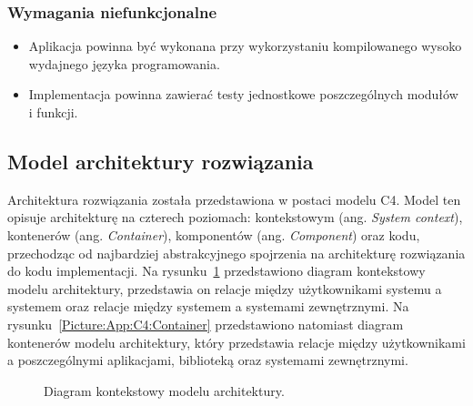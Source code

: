         \subsubsection{Wymagania niefunkcjonalne}

            \begin{itemize}
            \item Aplikacja powinna być wykonana przy wykorzystaniu kompilowanego wysoko wydajnego języka programowania.
                \item Implementacja powinna zawierać testy jednostkowe poszczególnych modułów i funkcji.
            \end{itemize}

    \subsection{Model architektury rozwiązania}

        Architektura rozwiązania została przedstawiona w postaci modelu C4\cite{C4}. Model ten opisuje architekturę na czterech poziomach: kontekstowym (ang. \textit{System context}), kontenerów (ang. \textit{Container}), komponentów (ang. \textit{Component}) oraz kodu, przechodząc od najbardziej abstrakcyjnego spojrzenia na architekturę rozwiązania do kodu implementacji. Na rysunku~\ref{Picture:App:C4:Context} przedstawiono diagram kontekstowy modelu architektury, przedstawia on relacje między użytkownikami systemu a systemem oraz relacje między systemem a systemami zewnętrznymi. Na rysunku~\ref{Picture:App:C4:Container} przedstawiono natomiast diagram kontenerów modelu architektury, który przedstawia relacje między użytkownikami a poszczególnymi aplikacjami, biblioteką oraz systemami zewnętrznymi.


        
        \begin{figure}[!htb]
            \begin{center}
                
            \end{center}
            \caption{
                Diagram kontekstowy modelu architektury.
            }\label{Picture:App:C4:Context}
        \end{figure}

